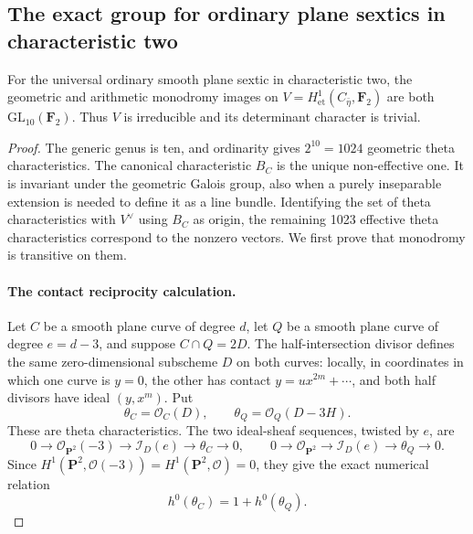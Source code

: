 \subsection{The exact group for ordinary plane sextics in characteristic two}
\label{subsec:sextic-exact}

\begin{theorem}\label{thm:sextic-full-monodromy}
For the universal ordinary smooth plane sextic in characteristic two,
the geometric and arithmetic monodromy images on
$V=H^1_{\mathrm{et}}(C_{\bar\eta},\mathbf F_2)$ are both
$\mathrm{GL}_{10}(\mathbf F_2)$.  Thus $V$ is irreducible and its
determinant character is trivial.
\end{theorem}

\begin{proof}
The generic genus is ten, and ordinarity gives $2^{10}=1024$
geometric theta characteristics.  The canonical characteristic $B_C$
is the unique non-effective one.  It is invariant under the
geometric Galois group, also when a purely inseparable extension is
needed to define it as a line bundle.  Identifying the set of theta
characteristics with $V^\vee$ using $B_C$ as origin, the remaining
1023 effective theta characteristics correspond to the nonzero
vectors.  We first prove that monodromy is transitive on them.

\paragraph{The contact reciprocity calculation.}
Let $C$ be a smooth plane curve of degree $d$, let $Q$ be a smooth
plane curve of degree $e=d-3$, and suppose $C\cap Q=2D$.
The half-intersection divisor defines the same zero-dimensional
subscheme $D$ on both curves: locally, in coordinates in which one
curve is $y=0$, the other has contact $y=u x^{2m}+\cdots$, and both
half divisors have ideal $(y,x^m)$.
Put
\[
 \theta_C=\mathcal O_C(D),\qquad
 \theta_Q=\mathcal O_Q(D-3H).
\]
These are theta characteristics.  The two ideal-sheaf sequences,
twisted by $e$, are
\[
 0\to\mathcal O_{\mathbf P^2}(-3)\to\mathcal I_D(e)
       \to\theta_C\to0,
 \qquad
 0\to\mathcal O_{\mathbf P^2}\to\mathcal I_D(e)
       \to\theta_Q\to0.
\]
Since $H^1(\mathbf P^2,\mathcal O(-3))=H^1(\mathbf P^2,\mathcal O)=0$,
they give the exact numerical relation
\begin{equation}\label{eq:contact-reciprocity}
 h^0(\theta_C)=1+h^0(\theta_Q).
\end{equation}


\end{proof}
